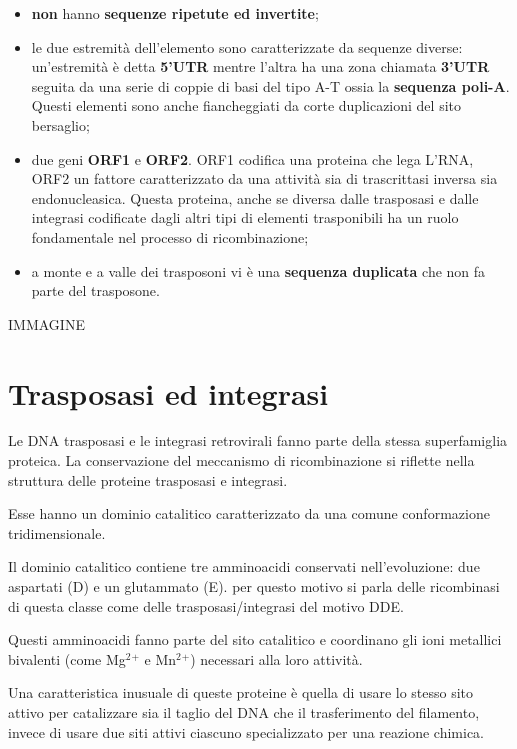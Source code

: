 \documentclass[11pt]{book}
\begin{document}
\begin{itemize}
\itemsep1pt\parskip0pt
\item
  \textbf{non} hanno \textbf{sequenze ripetute ed invertite};
\item
  le due estremità dell'elemento sono caratterizzate da sequenze
  diverse: un'estremità è detta \textbf{5'UTR} mentre l'altra ha una
  zona chiamata \textbf{3'UTR} seguita da una serie di coppie di basi
  del tipo A-T ossia la \textbf{sequenza poli-A}. Questi elementi sono
  anche fiancheggiati da corte duplicazioni del sito bersaglio;
\item
  due geni \textbf{ORF1} e \textbf{ORF2}. ORF1 codifica una proteina che
  lega L'RNA, ORF2 un fattore caratterizzato da una attività sia di
  trascrittasi inversa sia endonucleasica. Questa proteina, anche se
  diversa dalle trasposasi e dalle integrasi codificate dagli altri tipi
  di elementi trasponibili ha un ruolo fondamentale nel processo di
  ricombinazione;
\item
  a monte e a valle dei trasposoni vi è una \textbf{sequenza duplicata}
  che non fa parte del trasposone.
\end{itemize}

IMMAGINE

\section{Trasposasi ed integrasi}\label{trasposasi-ed-integrasi}

Le DNA trasposasi e le integrasi retrovirali fanno parte della stessa
superfamiglia proteica. La conservazione del meccanismo di
ricombinazione si riflette nella struttura delle proteine trasposasi e
integrasi.

Esse hanno un dominio catalitico caratterizzato da una comune
conformazione tridimensionale.

Il dominio catalitico contiene tre amminoacidi conservati
nell'evoluzione: due aspartati (D) e un glutammato (E). per questo
motivo si parla delle ricombinasi di questa classe come delle
trasposasi/integrasi del motivo DDE.

Questi amminoacidi fanno parte del sito catalitico e coordinano gli ioni
metallici bivalenti (come Mg\(^2\)\(^+\) e Mn\(^2\)\(^+\)) necessari
alla loro attività.

Una caratteristica inusuale di queste proteine è quella di usare lo
stesso sito attivo per catalizzare sia il taglio del DNA che il
trasferimento del filamento, invece di usare due siti attivi ciascuno
specializzato per una reazione chimica.
\end{document}
